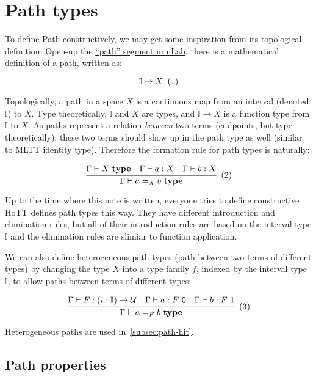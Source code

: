 \section{Path types}
\label{sec:path}

To define Path constructively,
we may get some inspiration from its topological definition.
Open-up the \href{https://ncatlab.org/nlab/show/path}{``path'' segment in nLab},
there is a mathematical definition of a path, written as:

\[
  \mathbb I \rightarrow X
  \xtag
\]

Topologically, a path in a space $X$ is a continuous map
from an interval (denoted $\mathbb I$) to $X$.
Type theoretically, $\mathbb I$ and $X$ are types,
and $\mathbb I \rightarrow X$ is a function type from $\mathbb I$ to $X$.
As paths represent a relation \textit{between} two terms
(endpoints, but type theoretically),
these two terms should show up in the path type as well
(similar to MLTT identity type).
Therefore the formation rule for path types is naturally:

\[
  \cfrac{
    \Gamma \vdash X \ \textbf{type}
    \quad
    \Gamma \vdash a : X
    \quad
    \Gamma \vdash b : X
  }{\Gamma \vdash a =_X b \ \textbf{type}}
  \xtag
\]

Up to the time where this note is written,
everyone tries to define constructive HoTT defines path types this way.
They have different introduction and elimination rules,
but all of their introduction rules are
based on the interval type $\mathbb I$
and the elimination rules are slimiar to function application.

We can also define heterogeneous path types
(path between two terms of different types)
by changing the type $X$ into a type family $f$,
indexed by the interval type $\mathbb I$,
to allow paths between terms of different types:

\[
  \cfrac{
    \Gamma \vdash F : (i : \mathbb I) \rightarrow \mathcal U
    \quad
    \Gamma \vdash a : F\ \textsf 0
    \quad
    \Gamma \vdash b : F\ \textsf 1
  }{\Gamma \vdash a =_F b \ \textbf{type}}
  \xtag \label{eqn:hetero-path}
\]

Heterogeneous paths are used in~\cref{subsec:path-hit}.



\subsection{Path properties}
\label{subsec:path-prop}


